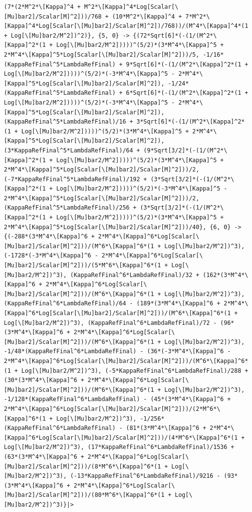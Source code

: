 \documentclass[11pt]{article}
\begin{document}
\begin{verbatim}
(7*(2*M^2*\[Kappa]^4 + M^2*\[Kappa]^4*Log[Scalar[\[Mu]bar2]/Scalar[M]^2]))/768 + (10*M^2*\[Kappa]^4 + 7*M^2*\[Kappa]^4*Log[Scalar[\[Mu]bar2]/Scalar[M]^2])/768))/(M^4*\[Kappa]^4*(1 + Log[\[Mu]bar2/M^2])^2)}, {5, 0} -> {(72*Sqrt[6]*(-(1/(M^2*\[Kappa]^2*(1 + Log[\[Mu]bar2/M^2]))))^(5/2)*(3*M^4*\[Kappa]^5 + 2*M^4*\[Kappa]^5*Log[Scalar[\[Mu]bar2]/Scalar[M]^2]))/5, -1/16*(KappaRefFinal^5*LambdaRefFinal) + 9*Sqrt[6]*(-(1/(M^2*\[Kappa]^2*(1 + Log[\[Mu]bar2/M^2]))))^(5/2)*(-3*M^4*\[Kappa]^5 - 2*M^4*\[Kappa]^5*Log[Scalar[\[Mu]bar2]/Scalar[M]^2]), -1/24*(KappaRefFinal^5*LambdaRefFinal) + 6*Sqrt[6]*(-(1/(M^2*\[Kappa]^2*(1 + Log[\[Mu]bar2/M^2]))))^(5/2)*(-3*M^4*\[Kappa]^5 - 2*M^4*\[Kappa]^5*Log[Scalar[\[Mu]bar2]/Scalar[M]^2]), (KappaRefFinal^5*LambdaRefFinal)/16 + 3*Sqrt[6]*(-(1/(M^2*\[Kappa]^2*(1 + Log[\[Mu]bar2/M^2]))))^(5/2)*(3*M^4*\[Kappa]^5 + 2*M^4*\[Kappa]^5*Log[Scalar[\[Mu]bar2]/Scalar[M]^2]), (3*KappaRefFinal^5*LambdaRefFinal)/64 + (9*Sqrt[3/2]*(-(1/(M^2*\[Kappa]^2*(1 + Log[\[Mu]bar2/M^2]))))^(5/2)*(3*M^4*\[Kappa]^5 + 2*M^4*\[Kappa]^5*Log[Scalar[\[Mu]bar2]/Scalar[M]^2]))/2, (-7*KappaRefFinal^5*LambdaRefFinal)/192 + (3*Sqrt[3/2]*(-(1/(M^2*\[Kappa]^2*(1 + Log[\[Mu]bar2/M^2]))))^(5/2)*(-3*M^4*\[Kappa]^5 - 2*M^4*\[Kappa]^5*Log[Scalar[\[Mu]bar2]/Scalar[M]^2]))/2, (KappaRefFinal^5*LambdaRefFinal)/256 + (3*Sqrt[3/2]*(-(1/(M^2*\[Kappa]^2*(1 + Log[\[Mu]bar2/M^2]))))^(5/2)*(3*M^4*\[Kappa]^5 + 2*M^4*\[Kappa]^5*Log[Scalar[\[Mu]bar2]/Scalar[M]^2]))/40}, {6, 0} -> {(-288*(3*M^4*\[Kappa]^6 + 2*M^4*\[Kappa]^6*Log[Scalar[\[Mu]bar2]/Scalar[M]^2]))/(M^6*\[Kappa]^6*(1 + Log[\[Mu]bar2/M^2])^3), (-1728*(-3*M^4*\[Kappa]^6 - 2*M^4*\[Kappa]^6*Log[Scalar[\[Mu]bar2]/Scalar[M]^2]))/(5*M^6*\[Kappa]^6*(1 + Log[\[Mu]bar2/M^2])^3), (KappaRefFinal^6*LambdaRefFinal)/32 + (162*(3*M^4*\[Kappa]^6 + 2*M^4*\[Kappa]^6*Log[Scalar[\[Mu]bar2]/Scalar[M]^2]))/(M^6*\[Kappa]^6*(1 + Log[\[Mu]bar2/M^2])^3), (KappaRefFinal^6*LambdaRefFinal)/64 - (189*(3*M^4*\[Kappa]^6 + 2*M^4*\[Kappa]^6*Log[Scalar[\[Mu]bar2]/Scalar[M]^2]))/(M^6*\[Kappa]^6*(1 + Log[\[Mu]bar2/M^2])^3), (KappaRefFinal^6*LambdaRefFinal)/72 - (96*(3*M^4*\[Kappa]^6 + 2*M^4*\[Kappa]^6*Log[Scalar[\[Mu]bar2]/Scalar[M]^2]))/(M^6*\[Kappa]^6*(1 + Log[\[Mu]bar2/M^2])^3), -1/48*(KappaRefFinal^6*LambdaRefFinal) - (36*(-3*M^4*\[Kappa]^6 - 2*M^4*\[Kappa]^6*Log[Scalar[\[Mu]bar2]/Scalar[M]^2]))/(M^6*\[Kappa]^6*(1 + Log[\[Mu]bar2/M^2])^3), (-5*KappaRefFinal^6*LambdaRefFinal)/288 + (30*(3*M^4*\[Kappa]^6 + 2*M^4*\[Kappa]^6*Log[Scalar[\[Mu]bar2]/Scalar[M]^2]))/(M^6*\[Kappa]^6*(1 + Log[\[Mu]bar2/M^2])^3), -1/128*(KappaRefFinal^6*LambdaRefFinal) - (45*(3*M^4*\[Kappa]^6 + 2*M^4*\[Kappa]^6*Log[Scalar[\[Mu]bar2]/Scalar[M]^2]))/(2*M^6*\[Kappa]^6*(1 + Log[\[Mu]bar2/M^2])^3), -1/256*(KappaRefFinal^6*LambdaRefFinal) - (81*(3*M^4*\[Kappa]^6 + 2*M^4*\[Kappa]^6*Log[Scalar[\[Mu]bar2]/Scalar[M]^2]))/(4*M^6*\[Kappa]^6*(1 + Log[\[Mu]bar2/M^2])^3), (17*KappaRefFinal^6*LambdaRefFinal)/1536 + (63*(3*M^4*\[Kappa]^6 + 2*M^4*\[Kappa]^6*Log[Scalar[\[Mu]bar2]/Scalar[M]^2]))/(8*M^6*\[Kappa]^6*(1 + Log[\[Mu]bar2/M^2])^3), (-13*KappaRefFinal^6*LambdaRefFinal)/9216 - (93*(3*M^4*\[Kappa]^6 + 2*M^4*\[Kappa]^6*Log[Scalar[\[Mu]bar2]/Scalar[M]^2]))/(80*M^6*\[Kappa]^6*(1 + Log[\[Mu]bar2/M^2])^3)}|>
\end{verbatim}
\end{document}
